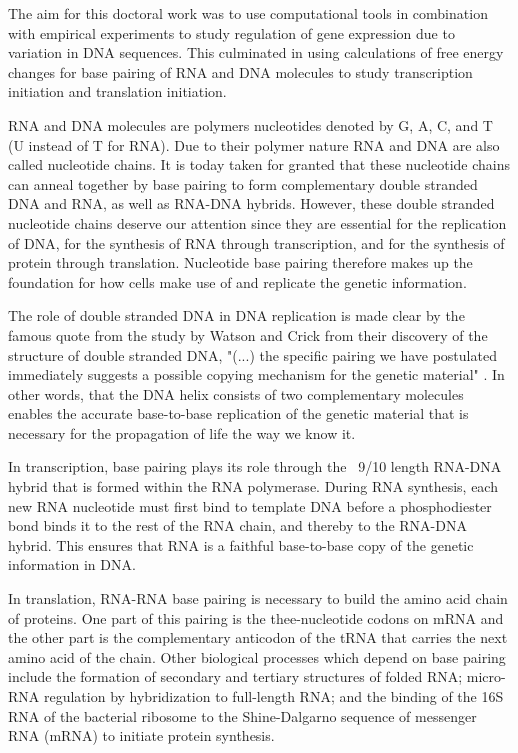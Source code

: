 %
The aim for this doctoral work was to use computational tools in combination
with empirical experiments to study regulation of gene expression due to
variation in DNA sequences. This culminated in using calculations of free
energy changes for base pairing of RNA and DNA molecules to study transcription
initiation and translation initiation.

RNA and DNA molecules are polymers nucleotides denoted by G, A, C, and T (U
instead of T for RNA). Due to their polymer nature RNA and DNA are also called
nucleotide chains. It is today taken for granted that these nucleotide chains
can anneal together by base pairing to form complementary double stranded DNA
and RNA, as well as RNA-DNA hybrids.  However, these double stranded nucleotide
chains deserve our attention since they are essential for the replication
of DNA, for the synthesis of RNA through transcription, and for the synthesis
of protein through translation.  Nucleotide base pairing therefore makes up the
foundation for how cells make use of and replicate the genetic information.

The role of double stranded DNA in DNA replication is made clear by the famous
quote from the study by Watson and Crick from their discovery of the structure
of double stranded DNA, "(...) the specific pairing we have postulated
immediately suggests a possible copying mechanism for the genetic material"
\cite{watson_molecular_1953}. In other words, that the DNA helix consists of
two complementary molecules enables the accurate base-to-base replication of
the genetic material that is necessary for the propagation of life the way we
know it.

In transcription, base pairing plays its role through the ~9/10 length RNA-DNA
hybrid that is formed within the RNA polymerase. During RNA synthesis, each new
RNA nucleotide must first bind to template DNA before a phosphodiester bond
binds it to the rest of the RNA chain, and thereby to the RNA-DNA hybrid. This
ensures that RNA is a faithful base-to-base copy of the genetic information in
DNA.

In translation, RNA-RNA base pairing is necessary to build the amino acid chain
of proteins. One part of this pairing is the thee-nucleotide codons on mRNA and
the other part is the complementary anticodon of the tRNA that carries the next
amino acid of the chain. Other biological processes which depend on base
pairing include the formation of secondary and tertiary structures of folded
RNA; micro-RNA regulation by hybridization to full-length RNA; and the binding
of the 16S RNA of the bacterial ribosome to the Shine-Dalgarno sequence of
messenger RNA (mRNA) to initiate protein synthesis.

